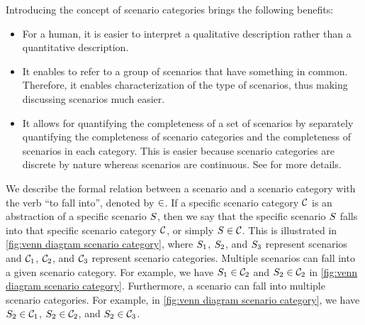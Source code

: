 Introducing the concept of scenario categories brings the following benefits:
\begin{itemize}
	\item For a human, it is easier to interpret a qualitative description rather than a quantitative description.
	\item It enables to refer to a group of scenarios that have something in common. Therefore, it enables characterization of the type of scenarios, thus making discussing scenarios much easier.
	\cbstartd
	\item It allows for quantifying the completeness of a set of scenarios by separately quantifying the completeness of scenario categories and the completeness of scenarios in each category.
	This is easier because scenario categories are discrete by nature whereas scenarios are continuous. See \cite{degelder2019completeness} for more details.
	\cbend
\end{itemize}

We describe the formal relation between a scenario and a scenario category with the verb ``to fall into'', denoted by $\in$. If a specific scenario category $\mathcal{C}$ is an abstraction of a specific scenario $S$, then we say that the specific scenario $S$ falls into that specific scenario category $\mathcal{C}$, or simply $S \in \mathcal{C}$. \cbstartc This is illustrated in \cref{fig:venn diagram scenario category}, where $S_{1}$, $S_{2}$, and $S_{3}$ represent scenarios and $\mathcal{C}_{1}$, $\mathcal{C}_{2}$, and $\mathcal{C}_{3}$ represent scenario categories. Multiple scenarios can fall into a given scenario category. For example, we have $S_{1} \in \mathcal{C}_{2}$ and $S_{2} \in \mathcal{C}_{2}$ in \cref{fig:venn diagram scenario category}. 
Furthermore, a scenario can fall into multiple scenario categories. For example, in \cref{fig:venn diagram scenario category}, we have $S_{2} \in \mathcal{C}_{1}$, $S_{2} \in \mathcal{C}_{2}$, and $S_{2} \in \mathcal{C}_{3}$.
\cbend


